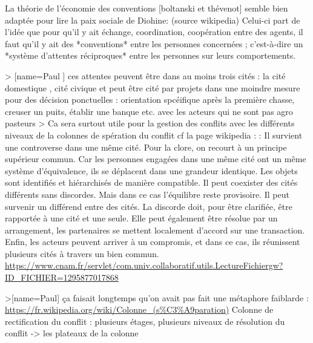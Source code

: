 La théorie de l'économie des conventions [boltanski et thévenot]  semble bien adaptée pour lire la paix sociale de Diohine: (source wikipedia) Celui-ci part de l'idée que pour qu'il y ait échange, coordination, coopération entre des agents, il faut qu'il y ait des *conventions* entre les personnes concernées ; c’est-à-dire un *système d'attentes réciproques* entre les personnes sur leurs comportements.

> [name=Paul ] ces attentes peuvent être dans au moins trois cités : la cité domestique , cité civique et peut être cité par projets dans une moindre mesure pour des décision ponctuelles : orientation spcéifique après la première chasse, creuser un puits, établir une banque etc. avec les acteurs qui ne sont pas agro pasteurs
> Ca sera surtout utile pour la gestion des conflits avec les différents niveaux de la colonnes de spération du conflit  cf la page wikipedia : :     Il survient une controverse dans une même cité. Pour la clore, on recourt à un principe supérieur commun. Car les personnes engagées dans une même cité ont un même système d'équivalence, ils se déplacent dans une grandeur identique. Les objets sont identifiés et hiérarchisés de manière compatible.
    Il peut coexister des cités différents sans discordes. Mais dans ce cas l'équilibre reste provisoire.
    Il peut survenir un différend entre des cités. La discorde doit, pour être clarifiée, être rapportée à une cité et une seule. Elle peut également être résolue par un arrangement, les partenaires se mettent localement d'accord sur une transaction. Enfin, les acteurs peuvent arriver à un compromis, et dans ce cas, ils réunissent plusieurs cités à travers un bien commun.
   \url{ https://www.cnam.fr/servlet/com.univ.collaboratif.utils.LectureFichiergw?ID_FICHIER=1295877017868}


>[name=Paul] ça faisait longtemps qu'on avait pas fait une métaphore faiblarde : \url{https://fr.wikipedia.org/wiki/Colonne_(s%C3%A9paration)}
Colonne de rectification du conflit : plusieurs étages, plusieurs niveaux de résolution du conflit -> les plateaux de la colonne

